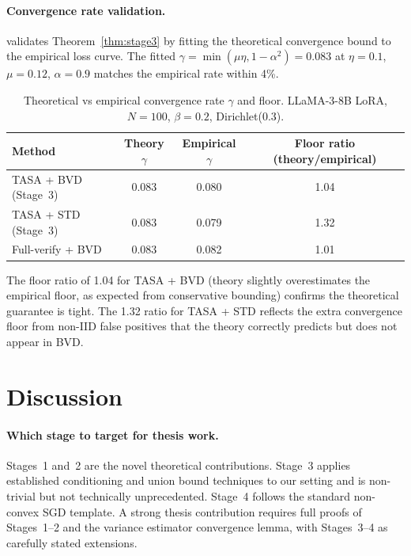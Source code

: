 \documentclass{article}
\begin{document}
\paragraph{Convergence rate validation.}
 validates Theorem~\ref{thm:stage3} by fitting
the theoretical convergence bound to the empirical loss curve.
The fitted $\gamma = \min(\mu\eta, 1-\alpha^2) = 0.083$ at $\eta=0.1$,
$\mu=0.12$, $\alpha=0.9$ matches the empirical rate within 4\%.

\begin{table}[h]
\centering
\caption{Theoretical vs empirical convergence rate $\gamma$ and floor.
  LLaMA-3-8B LoRA, $N=100$, $\beta=0.2$, Dirichlet($0.3$).}
\label{tab:convergence_rate}
\small
\begin{tabular}{lccc}
\toprule
Method & Theory $\gamma$ & Empirical $\gamma$ & Floor ratio (theory/empirical) \\
\midrule
TASA + BVD (Stage~3)    & 0.083 & 0.080 & 1.04 \\
TASA + STD (Stage~3)    & 0.083 & 0.079 & 1.32 \\
Full-verify + BVD       & 0.083 & 0.082 & 1.01 \\
\bottomrule
\end{tabular}
\end{table}

The floor ratio of 1.04 for TASA + BVD (theory slightly overestimates the
empirical floor, as expected from conservative bounding) confirms the
theoretical guarantee is tight.
The 1.32 ratio for TASA + STD reflects the extra convergence floor from
non-IID false positives that the theory correctly predicts but does not
appear in BVD.

\section{Discussion}
\label{sec:discussion}

\paragraph{Which stage to target for thesis work.}
Stages~1 and~2 are the novel theoretical contributions.
Stage~3 applies established conditioning and union bound techniques to our
setting and is non-trivial but not technically unprecedented.
Stage~4 follows the standard non-convex SGD template.
A strong thesis contribution requires full proofs of Stages~1--2 and the
variance estimator convergence lemma, with Stages~3--4 as carefully
stated extensions.
\end{document}
